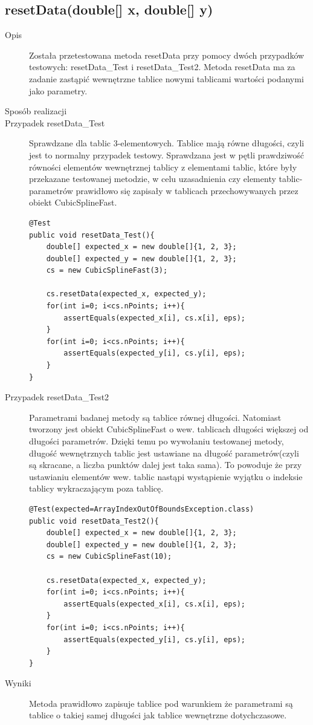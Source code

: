 \documentclass[12pt,a4paper,notitlepage]{article}
\begin{document}
\subsection{resetData(double[] x, double[] y)}
\begin{description}
\item [Opis] Została przetestowana metoda resetData przy pomocy dwóch przypadków testowych: resetData\_Test i resetData\_Test2.
Metoda resetData ma za zadanie zastąpić wewnętrzne tablice nowymi tablicami wartości podanymi jako parametry.
\item [Sposób realizacji]
\item [Przypadek resetData\_Test] Sprawdzane dla tablic 3-elementowych. Tablice mają równe długości, czyli jest to normalny przypadek testowy. Sprawdzana jest w pętli prawdziwość równości elementów wewnętrznej tablicy z elementami tablic, które były przekazane testowanej metodzie, w celu uzasadnienia czy elementy tablic-parametrów prawidłowo się zapisały w tablicach przechowywanych przez obiekt CubicSplineFast.

\begin{lstlisting}
@Test
public void resetData_Test(){
    double[] expected_x = new double[]{1, 2, 3};
    double[] expected_y = new double[]{1, 2, 3};
    cs = new CubicSplineFast(3);

    cs.resetData(expected_x, expected_y);
    for(int i=0; i<cs.nPoints; i++){
        assertEquals(expected_x[i], cs.x[i], eps);
    }
    for(int i=0; i<cs.nPoints; i++){
        assertEquals(expected_y[i], cs.y[i], eps);
    }
}
\end{lstlisting}

\item [Przypadek resetData\_Test2] Parametrami badanej metody są tablice równej długości. Natomiast tworzony jest obiekt CubicSplineFast o wew. tablicach długości większej od długości parametrów. Dzięki temu po wywołaniu testowanej metody, długość wewnętrznych tablic jest ustawiane na długość parametrów(czyli są skracane, a liczba punktów dalej jest taka sama). To powoduje że przy ustawianiu elementów wew. tablic nastąpi
wystąpienie wyjątku o indeksie tablicy wykraczającym poza tablicę.

\begin{lstlisting}
@Test(expected=ArrayIndexOutOfBoundsException.class)
public void resetData_Test2(){
    double[] expected_x = new double[]{1, 2, 3};
    double[] expected_y = new double[]{1, 2, 3};
    cs = new CubicSplineFast(10);

    cs.resetData(expected_x, expected_y);
    for(int i=0; i<cs.nPoints; i++){
        assertEquals(expected_x[i], cs.x[i], eps);
    }
    for(int i=0; i<cs.nPoints; i++){
        assertEquals(expected_y[i], cs.y[i], eps);
    }
}
\end{lstlisting}

\item [Wyniki] Metoda prawidłowo zapisuje tablice pod warunkiem że parametrami są tablice o takiej samej długości jak tablice wewnętrzne dotychczasowe.
\end{description}
\end{document}
